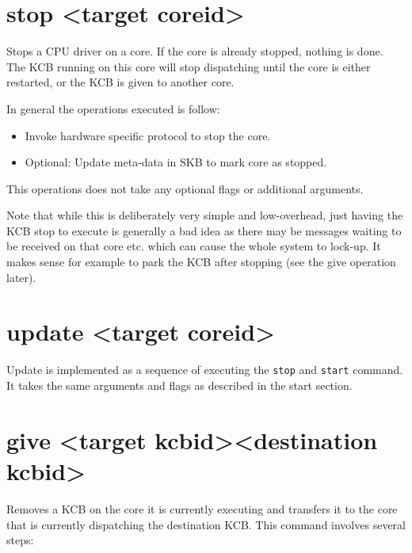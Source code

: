 \documentclass[a4paper,11pt,twoside]{report}
\begin{document}
{{\begin{itemize}
\end{itemize}


\section{stop \textless target coreid\textgreater}

Stops a CPU driver on a core. If the core is already stopped, nothing is done.
The KCB running on this core will stop dispatching until the core is either
restarted, or the KCB is given to another core.

In general the operations executed is follow:

\begin{itemize}

\item Invoke hardware specific protocol to stop the core.

\item Optional: Update meta-data in SKB to mark core as stopped.

\end{itemize}

This operations does not take any optional flags or additional arguments.

Note that while this is deliberately very simple and low-overhead, just having
the KCB stop to execute is generally a bad idea as there may be messages waiting
to be received on that core etc. which can cause the whole system to lock-up. It
makes sense for example to park the KCB after stopping (see the give operation
later).

\section{update \textless target coreid\textgreater}

Update is implemented as a sequence of executing the \texttt{stop} and
\texttt{start} command. It takes the same arguments and flags as described in
the start section.

\section{give \textless target kcbid\textgreater \textless destination kcbid\textgreater}

Removes a KCB on the core it is currently executing and transfers it to
the core that is currently dispatching the destination KCB.
This command involves several steps:

}}
\end{document}
